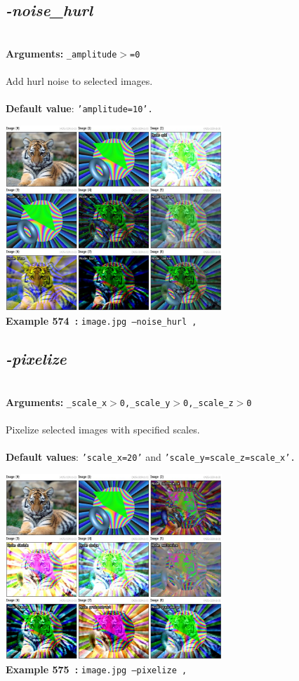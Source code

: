\documentclass[a4paper,11pt,twoside]{book}
\begin{document}
\subsection{\emph{-noise\_hurl} }\vspace*{-0.5em}
~\\\textbf{Arguments: } 
{\small \texttt{\_amplitude$>$=0}}\\~\\
Add hurl noise to selected images.
~\\~\\\textbf{Default value}: {\small \texttt{'amplitude=10'.}}
\begin{center}\includegraphics[keepaspectratio=true,height=7cm,width=\textwidth]{img/gmic_def574.jpg}\\
{\footnotesize \textbf{Example 574~:} \texttt{image.jpg --noise\_hurl ,}}
\end{center}

\subsection{\emph{-pixelize} }\vspace*{-0.5em}
~\\\textbf{Arguments: } 
{\small \texttt{\_scale\_x$>$0,\_scale\_y$>$0,\_scale\_z$>$0}}\\~\\
Pixelize selected images with specified scales.
~\\~\\\textbf{Default values}: {\small \texttt{'scale\_x=20'} and \texttt{'scale\_y=scale\_z=scale\_x'.}}
\begin{center}\includegraphics[keepaspectratio=true,height=7cm,width=\textwidth]{img/gmic_def575.jpg}\\
{\footnotesize \textbf{Example 575~:} \texttt{image.jpg --pixelize ,}}
\end{center}
\end{document}
